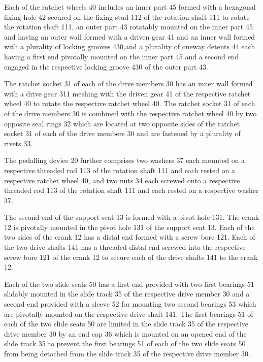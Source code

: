 \documentclass[10pt, a4paper]{article}
\begin{document}
{{			Each of the ratchet wheels 40 includes an inner part 45 formed with a hexagonal fixing
			hole 42 secured on the fixing stud 112 of the rotation shaft 111 to rotate the rotation shaft 111, an outer part 43 rotatably mounted on the inner part 45 and having an outer wall
			formed with a driven gear 41 and an inner wall formed with a plurality of locking grooves
			430,and a plurality of oneway detents 44 each having a first end pivotally mounted on the
			inner part 45 and a second end engaged in the respective locking groove 430 of the outer
			part 43. \newline
			
			The ratchet socket 31 of each of the drive members 30 has an inner wall formed with a
			drive gear 311 meshing with the driven gear 41 of the respective ratchet wheel 40 to rotate
			the respective ratchet wheel 40. The ratchet socket 31 of each of the drive members 30 is
			combined with the respective ratchet wheel 40 by two opposite seal rings 32 which are
			located at two opposite sides of the ratchet socket 31 of each of the drive members 30 and
			are fastened by a plurality of rivets 33. \newline
			
			The pedalling device 20 further comprises two washers 37 each mounted on a respective
			threaded rod 113 of the rotation shaft 111 and each rested on a respective ratchet wheel 40, and two nuts 34 each screwed onto a respective threaded rod 113 of the rotation shaft
			111 and each rested on a respective washer 37. \newline
			
			The second end of the support seat 13 is formed with a pivot hole 131. The crank 12 is
			pivotally mounted in the pivot hole 131 of the support seat 13. Each of the two sides of the crank 12 has a distal end formed with a screw bore 121. Each of the two drive shafts 141 has a threaded distal end screwed into the respective screw bore 121 of the crank 12 to
			secure each of the drive shafts 141 to the crank 12. \newline
			
			Each of the two slide seats 50 has a first end provided with two first bearings 51 slidably
			mounted in the slide track 35 of the respective drive member 30 and a second end
			provided with a sleeve 52 for mounting two second bearings 53 which are pivotally
			mounted on the respective drive shaft 141. The first bearings 51 of each of the two slide
			seats 50 are limited in the slide track 35 of the respective drive member 30 by an end cap
			36 which is mounted on an opened end of the slide track 35 to prevent the first bearings
			51 of each of the two slide seats 50 from being detached from the slide track 35 of the
			respective drive member 30. \newline
			
}}
\end{document}
